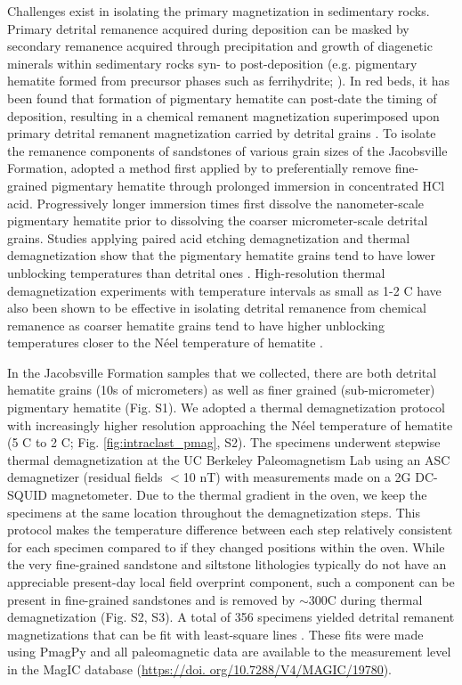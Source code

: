 Challenges exist in isolating the primary magnetization in sedimentary rocks. Primary detrital remanence acquired during deposition can be masked by secondary remanence acquired through precipitation and growth of diagenetic minerals within sedimentary rocks syn- to post-deposition (e.g. pigmentary hematite formed from precursor phases such as ferrihydrite; \cite{Jiang2018a}). In red beds, it has been found that formation of pigmentary hematite can post-date the timing of deposition, resulting in a chemical remanent magnetization superimposed upon primary detrital remanent magnetization carried by detrital grains \citep{Collinson1974a, Tauxe1980a}. To isolate the remanence components of sandstones of various grain sizes of the Jacobsville Formation, \cite{Roy1978a} adopted a method first applied by \cite{Collinson1965c} to preferentially remove fine-grained pigmentary hematite through prolonged immersion in concentrated HCl acid. Progressively longer immersion times first dissolve the nanometer-scale pigmentary hematite prior to dissolving the coarser micrometer-scale detrital grains. Studies applying paired acid etching demagnetization and thermal demagnetization show that the pigmentary hematite grains tend to have lower unblocking temperatures than detrital ones \citep{Tauxe1980a, Bilardello2010c}. High-resolution thermal demagnetization experiments with temperature intervals as small as 1-2 \textdegree C have also been shown to be effective in isolating detrital remanence from chemical remanence as coarser hematite grains tend to have higher unblocking temperatures closer to the N\'eel temperature of hematite \citep{Jiang2015a,Swanson-Hysell2019b}. 

In the Jacobsville Formation samples that we collected, there are both detrital hematite grains (10s of micrometers) as well as finer grained (sub-micrometer) pigmentary hematite (Fig. S1). We adopted a thermal demagnetization protocol with increasingly higher resolution approaching the N\'eel temperature of hematite (5 \textdegree C to 2 \textdegree C; Fig. \ref{fig:intraclast_pmag}, S2). The specimens underwent stepwise thermal demagnetization at the UC Berkeley Paleomagnetism Lab using an ASC demagnetizer (residual fields $<$10 nT) with measurements made on a 2G DC-SQUID magnetometer. Due to the thermal gradient in the oven, we keep the specimens at the same location throughout the demagnetization steps. This protocol makes the temperature difference between each step relatively consistent for each specimen compared to if they changed positions within the oven. While the very fine-grained sandstone and siltstone lithologies typically do not have an appreciable present-day local field overprint component, such a component can be present in fine-grained sandstones and is removed by $\sim$300\textdegree C during thermal demagnetization (Fig. S2, S3). A total of 356 specimens yielded detrital remanent magnetizations that can be fit with least-square lines \citep{Kirschvink1980a}. These fits were made using PmagPy \citep{Tauxe2016a} and all paleomagnetic data are available to the measurement level in the MagIC database (\url{https://doi. org/10.7288/V4/MAGIC/19780}).

